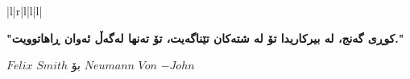 \documentclass[a4paper,12pt]{article}
\begin{document}
\begin{center}
\begin{table}[]
\begin{tabular}{|l|r|l|l|l|}
 \\ \hline
\end{tabular}
\end{table}
\begin{flushright}
\textbf{"کوڕی گەنج، لە بیرکاریدا تۆ لە شتەکان تێناگەیت، تۆ تەنها لەگەڵ ئەوان ڕاهاتوویت."}
\begin{center}
$Felix$ $Smith$ بۆ  $Neumann$ $Von$ $-John$
\end{center}
\end{flushright}
\end{center}
\end{document}

